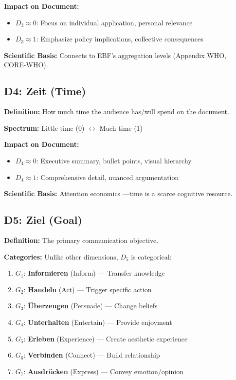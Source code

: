 \textbf{Impact on Document:}
\begin{itemize}[nosep]
\item $D_3 \approx 0$: Focus on individual application, personal relevance
\item $D_3 \approx 1$: Emphasize policy implications, collective consequences
\end{itemize}

\textbf{Scientific Basis:} Connects to EBF's aggregation levels
(Appendix WHO, CORE-WHO).

\subsection{D4: Zeit (Time)}

\textbf{Definition:} How much time the audience has/will spend on the document.

\textbf{Spectrum:} Little time (0) $\leftrightarrow$ Much time (1)

\textbf{Impact on Document:}
\begin{itemize}[nosep]
\item $D_4 \approx 0$: Executive summary, bullet points, visual hierarchy
\item $D_4 \approx 1$: Comprehensive detail, nuanced argumentation
\end{itemize}

\textbf{Scientific Basis:} Attention economics \citep{davenport2001}---time is
a scarce cognitive resource.

\subsection{D5: Ziel (Goal)}

\textbf{Definition:} The primary communication objective.

\textbf{Categories:} Unlike other dimensions, $D_5$ is categorical:

\begin{enumerate}[nosep]
\item $G_1$: \textbf{Informieren} (Inform) --- Transfer knowledge
\item $G_2$: \textbf{Handeln} (Act) --- Trigger specific action
\item $G_3$: \textbf{\"Uberzeugen} (Persuade) --- Change beliefs
\item $G_4$: \textbf{Unterhalten} (Entertain) --- Provide enjoyment
\item $G_5$: \textbf{Erleben} (Experience) --- Create aesthetic experience
\item $G_6$: \textbf{Verbinden} (Connect) --- Build relationship
\item $G_7$: \textbf{Ausdr\"ucken} (Express) --- Convey emotion/opinion
\end{enumerate}

